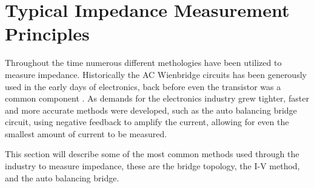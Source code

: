 \section{Typical Impedance Measurement Principles} \label{sec:TypicalMeasPrin}
Throughout the time numerous different methologies have been utilized to measure impedance. Historically the AC Wienbridge circuits has been generously used in the 
early days of electronics, back before even the transistor was a common component \cite{IET_LABS_LCR_PRINCIPLES}. As demands for the electronics industry grew tighter,
faster and more accurate methods were developed, such as the auto balancing bridge circuit, using negative feedback to amplify the current, allowing for even the
smallest amount of current to be measured.

This section will describe some of the most common methods used through the industry to measure impedance, these are the bridge topology, the I-V method, and the auto balancing bridge.

